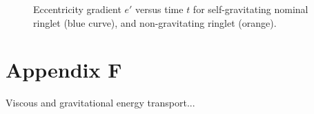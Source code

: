 \documentclass[preprint]{aastex62}
\begin{document}
\begin{figure}
    \caption{
        \label{fig:de_prime_nogravity}
        Eccentricity gradient $e'$ versus time $t$ for self-gravitating nominal ringlet (blue curve),
        and non-gravitating ringlet (orange).
    }
\end{figure}


\section{Appendix F}
\label{sec:Appendix F}

Viscous and gravitational energy transport...



\end{document}
